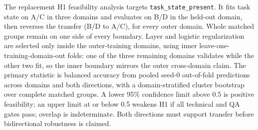 \documentclass[11pt]{article}
\begin{document}
The replacement H1 feasibility analysis targets \texttt{task\_state\_present}. It
fits task state on A/C in three domains and evaluates on B/D in the held-out
domain, then reverses the transfer (B/D to A/C), for every outer domain. Whole
matched groups remain on one side of every boundary. Layer and logistic
regularization are selected only inside the outer-training domains, using inner
leave-one-training-domain-out folds: one of the three remaining domains validates
while the other two fit, so the inner boundary mirrors the outer cross-domain
claim. The primary statistic is balanced accuracy from pooled seed-0 out-of-fold
predictions across domains and both directions, with a domain-stratified cluster
bootstrap over complete matched groups. A lower 95\% confidence limit above 0.5 is
positive feasibility; an upper limit at or below 0.5 weakens H1 if all technical
and QA gates pass; overlap is indeterminate. Both directions must support transfer
before bidirectional robustness is claimed.
\end{document}
